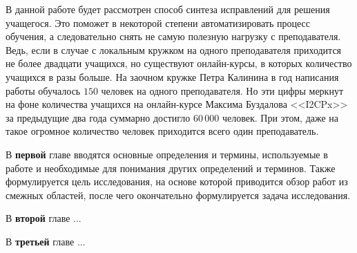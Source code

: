 \documentclass[specification,annotation]{itmo-student-thesis}
\begin{document}
В данной работе будет рассмотрен способ синтеза исправлений для решения учащегося. Это поможет в некоторой
степени автоматизировать процесс обучения, а следовательно снять не самую полезную нагрузку с преподавателя.
Ведь, если в случае с локальным кружком на одного преподавателя приходится не более двадцати учащихся, но существуют
онлайн-курсы, в которых количество учащихся в разы больше. На заочном кружке Петра Калинина в год написания работы
обучалось $150$ человек на одного преподавателя. Но эти цифры меркнут на фоне количества учащихся на онлайн-курсе 
Максима Буздалова <<I2CPx>> за предыдущие два года суммарно достигло $60\,000$ человек. При этом, даже на 
такое огромное количество человек приходится всего один преподаватель.

В \textbf{первой} главе вводятся основные определения и термины, используемые в работе и необходимые
для понимания других определений и терминов. Также формулируется цель исследования, на основе которой
приводится обзор работ из смежных областей, после чего окончательно формулируется задача исследования.

В \textbf{второй} главе ...

В \textbf{третьей} главе ...





\printmainbibliography
\end{document}
